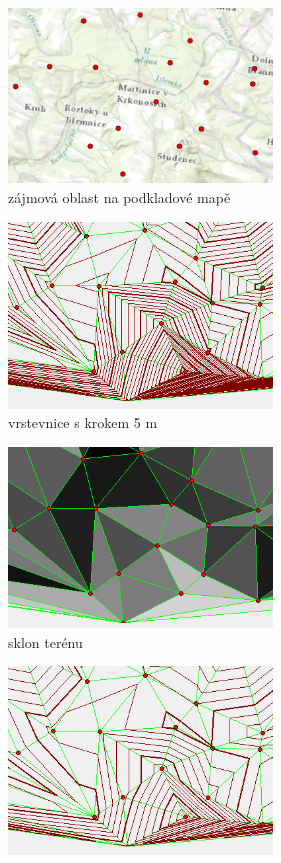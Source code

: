 \begin{figure}[H]

\begin{subfigure}{.475\linewidth}
\centering
  \includegraphics[width=7cm]{images/case1.png}
  \caption{zájmová oblast na podkladové mapě}
  \label{MLEDdet}
\end{subfigure}\hfill %
\begin{subfigure}{.475\linewidth}
\centering
  \includegraphics[width=7cm]{images/case1m5.png}
  \caption{vrstevnice s krokem 5 m}
  \label{energydetPSK}
\end{subfigure}\hfill
\medskip
\medskip
\begin{subfigure}{.475\linewidth}
\centering
  \includegraphics[width=7cm]{images/case1s.png}
  \caption{sklon terénu}
  \label{MLEDdet}
\end{subfigure}\hfill %
\begin{subfigure}{.475\linewidth}
\centering
  \includegraphics[width=7cm]{images/case1m.png}

\end{subfigure}
\end{figure}
